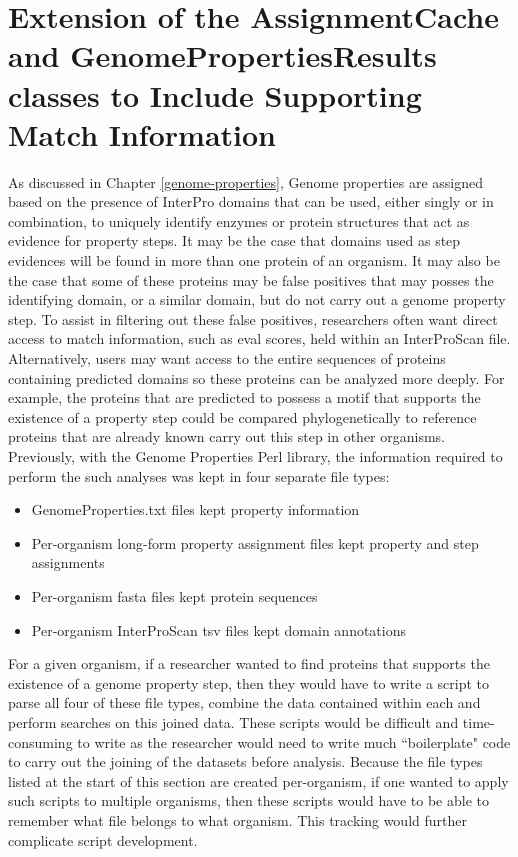 \section{Extension of the AssignmentCache and GenomePropertiesResults classes to 
Include Supporting Match Information}

As discussed in Chapter \ref{genome-properties}, Genome properties are assigned 
based on the presence of InterPro domains that can be used, either singly or in 
combination, to uniquely identify enzymes or protein structures that act as 
evidence for property steps. It may be the case that domains used as step 
evidences will be found in more than one protein of an organism. It may also be 
the case that some of these proteins may be false positives that may posses the 
identifying domain, or a similar domain, but do not carry out a genome property 
step. To assist in filtering out these false positives, researchers often want 
direct access to match information, such as \gls{eval} scores, held within an 
InterProScan file. Alternatively, users may want access to the entire sequences 
of proteins containing predicted domains so these proteins can be analyzed more 
deeply. For example, the proteins that are predicted to possess a motif that 
supports the existence of a property step could be compared phylogenetically to 
reference proteins that are already known carry out this step in other 
organisms. Previously, with the Genome Properties Perl library, the information 
required to perform the such analyses was kept in four separate file types:

\begin{itemize}
\item GenomeProperties.txt files kept property information
\item Per-organism long-form property assignment files kept property and step 
assignments
\item Per-organism \gls{fasta} files \cite{pearson19905} kept protein sequences 
\item  Per-organism InterProScan \gls{tsv} files kept domain annotations 
\end{itemize}

For a given organism, if a researcher wanted to find proteins that supports the 
existence of a genome property step, then they would have to write a script to 
parse all four of these file types, combine the data contained within each and 
perform searches on this joined data. These scripts would be difficult and 
time-consuming to write as the researcher would need to write much 
``boilerplate" code to carry out the joining of the datasets before analysis. 
Because the file types listed at the start of this section are created 
per-organism, if one wanted to apply such scripts to multiple organisms, then 
these scripts would have to be able to remember what file belongs to what 
organism. This tracking would further complicate script development.

